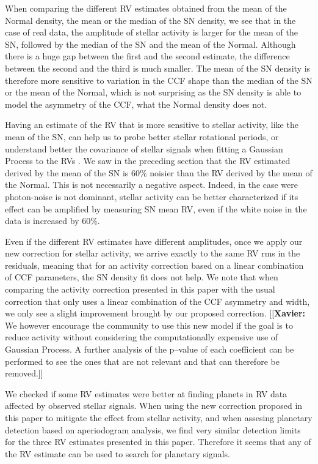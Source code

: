 \documentclass{aa}
\newcommand{\xavier}[1]{{\color{blue}[[\textbf{Xavier: }#1]]}}
\begin{document}
When comparing the different RV estimates obtained from the mean of the Normal density, the mean or the median of the SN density, we see that in the case of real data, the amplitude of stellar activity is larger for the mean of the SN, followed by the median of the SN and the mean of the Normal. Although there is a huge gap between the first and the second estimate, the difference between the second and the third is much smaller. The mean of the SN density is therefore more sensitive to variation in the CCF shape than the median of the SN or the mean of the Normal, which is not surprising as the SN density is able to model the asymmetry of the CCF, what the Normal density does not. 

Having an estimate of the RV that is more sensitive to stellar activity, like the mean of the SN, can help us to probe better stellar rotational periods, or understand better the covariance of stellar signals when fitting a Gaussian Process to the RVs \citep[e.g.][]{Faria-2016a, Haywood-2014}. We saw in the preceding section that the RV estimated derived by the mean of the SN is 60\% noisier than the RV derived by the mean of the Normal. This is not necessarily a negative aspect. Indeed, in the case were photon-noise is not dominant, stellar activity can be better characterized if its effect can be amplified by measuring SN mean RV, even if the white noise in the data is increased by 60\%.

Even if the different RV estimates have different amplitudes, once we apply our new correction for stellar activity, we arrive exactly to the same RV rms in the residuals, meaning that for an activity correction based on a linear combination of CCF parameters, the SN density fit does not help. We note that when comparing the activity correction presented in this paper with the usual correction that only uses a linear combination of the CCF asymmetry and width, we only see a slight improvement brought by our proposed correction. \xavier{We however encourage the community to use this new model if the goal is to reduce activity without considering the computationally expensive use of Gaussian Process. A further analysis of the p--value of each coefficient can be performed to see the ones that are not relevant and that can therefore be removed.}

We checked if some RV estimates were better at finding planets in RV data affected by observed stellar signals. When using the new correction proposed in this paper to mitigate the effect from stellar activity, and when assesing planetary detection based on aperiodogram analysis, we find very similar detection limits for the three RV estimates presented in this paper. Therefore it seems that any of the RV estimate can be used to search for planetary signals.
\end{document}
